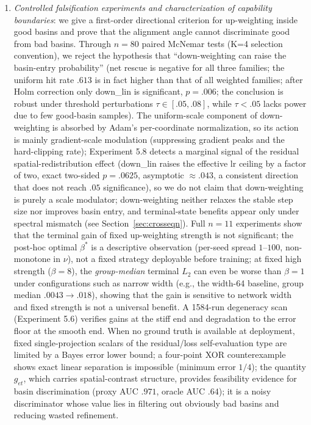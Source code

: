 \documentclass[11pt]{article}
\numberwithin{equation}{section}
\begin{document}
\begin{enumerate}[label=(\arabic*),leftmargin=2em,itemsep=2pt]
\item \emph{Controlled falsification experiments and characterization of capability boundaries}: we give a first-order directional criterion for up-weighting inside good basins and prove that the alignment angle cannot discriminate good from bad basins. Through $n=80$ paired McNemar tests (K=4 selection convention), we reject the hypothesis that ``down-weighting can raise the basin-entry probability'' (net rescue is negative for all three families; the uniform hit rate $.613$ is in fact higher than that of all weighted families; after Holm correction only down\_lin is significant, $p=.006$; the conclusion is robust under threshold perturbations $\tau\in[.05,.08]$, while $\tau<.05$ lacks power due to few good-basin samples). The uniform-scale component of down-weighting is absorbed by Adam's per-coordinate normalization, so its action is mainly gradient-scale modulation (suppressing gradient peaks and the hard-clipping rate); Experiment 5.8 detects a marginal signal of the residual spatial-redistribution effect (down\_lin raises the effective lr ceiling by a factor of two, exact two-sided $p=.0625$, asymptotic $\approx.043$, a consistent direction that does not reach $.05$ significance), so we do not claim that down-weighting is purely a scale modulator; down-weighting neither relaxes the stable step size nor improves basin entry, and terminal-state benefits appear only under spectral mismatch (see Section~\ref{sec:crosseqn}). Full $n=11$ experiments show that the terminal gain of fixed up-weighting strength is not significant; the post-hoc optimal $\beta^*$ is a descriptive observation (per-seed spread $1$--$100$, non-monotone in $\nu$), not a fixed strategy deployable before training; at fixed high strength ($\beta=8$), the \emph{group-median} terminal $L_2$ can even be worse than $\beta=1$ under configurations such as narrow width (e.g., the width-64 baseline, group median $.0043\to.018$), showing that the gain is sensitive to network width and fixed strength is not a universal benefit. A 1584-run degeneracy scan (Experiment 5.6) verifies gains at the stiff end and degradation to the error floor at the smooth end. When no ground truth is available at deployment, fixed single-projection scalars of the residual/loss self-evaluation type are limited by a Bayes error lower bound; a four-point XOR counterexample shows exact linear separation is impossible (minimum error $1/4$); the quantity $g_{et}$, which carries spatial-contrast structure, provides feasibility evidence for basin discrimination (proxy AUC $.971$, oracle AUC $.64$); it is a noisy discriminator whose value lies in filtering out obviously bad basins and reducing wasted refinement.
\end{enumerate}
\end{document}
